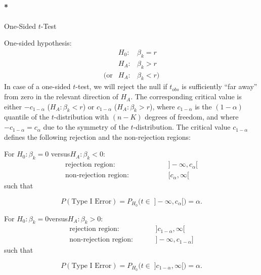 \documentclass[
  letterpaper,
  DIV=11,
  numbers=noendperiod]{scrreprt}
\let\oldparagraph\paragraph
\renewcommand{\paragraph}[1]{\oldparagraph{#1}\mbox{}}
\theoremstyle{definition}
\theoremstyle{plain}
\theoremstyle{plain}
\theoremstyle{remark}
\begin{document}
\hypertarget{one-sided-t-test}{%
\paragraph*{\texorpdfstring{One-Sided
\(t\)-Test}{One-Sided t-Test}}\label{one-sided-t-test}}

One-sided hypothesis: \begin{equation*}
\begin{array}{lll}
&H_0: & \beta_k =r\\
&H_A: & \beta_k >r\\
(\text{or}&H_A: & \beta_k< r)
\end{array}
\end{equation*} In case of a one-sided \(t\)-test, we will reject the
null if \(t_{obs}\) is sufficiently ``far away'' from zero in the
relevant direction of \(H_A\). The corresponding critical value is
either \(-c_{1-\alpha}\) (\(H_A:\beta_k< r\)) or \(c_{1-\alpha}\)
(\(H_A:\beta_k> r\)), where \(c_{1-\alpha}\) is the \((1-\alpha)\)
quantile of the \(t\)-distribution with \((n-K)\) degrees of freedom,
and where \(-c_{1-\alpha}=c_{\alpha}\) due to the symmetry of the
\(t\)-distribution. The critical value \(c_{1-\alpha}\) defines the
following rejection and the non-rejection regions:

For \(H_0: \beta_k=0\) \quad versus\quad \(H_A: \beta_k < 0\):
\begin{align*}
\text{rejection region:}   &\hspace{2cm}]-\infty,c_{\alpha}[ \\
\text{non-rejection region:}&\hspace{2cm}[c_{\alpha},\infty[
\end{align*} such that

\[
P(\text{Type I Error})=P_{H_0}\Big(t\in\;]-\infty,c_{\alpha}[\Big)=\alpha.
\]

For \(H_0: \beta_k=0\)\quad versus\quad\(H_A: \beta_k > 0\):
\begin{align*}
\text{rejection region:}&\hspace{1cm}]c_{1-\alpha}, \infty[\\
\text{non-rejection region:}&\hspace{1cm}]-\infty,c_{1-\alpha}]
\end{align*} such that

\[
P(\text{Type I Error})=P_{H_0}\Big(t\in\;]c_{1-\alpha}, \infty[\Big)=\alpha.
\]
\end{document}
